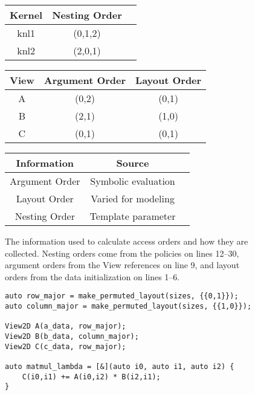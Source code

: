 \begin{figure*}

	\begin{subfigure}{0.9\textwidth}
		\begin{center}
			\begin{tabular} {|c|c|c|}
				\hline
				Kernel & Nesting Order \\ \hline
				knl1 & (0,1,2) \\
				knl2 & (2,0,1) \\
				\hline
			\end{tabular}
			\hspace{0.01\textwidth}
			\begin{tabular} {|c|c|c|}
				\hline 
				View & Argument Order & Layout Order \\  \hline 
				A & (0,2) & (0,1) \\ 
				B & (2,1) & (1,0) \\
				C & (0,1) & (0,1) \\
				\hline
			\end{tabular}
			\hspace{0.01\textwidth}
			\begin{tabular} {|c|c|c|}
				\hline
				Information & Source \\ \hline 
				Argument Order & Symbolic evaluation  \\
				Layout Order & Varied for modeling\\
				Nesting Order & Template parameter \\
				\hline
			\end{tabular}
		\end{center}
		\caption{The information used to calculate access orders and how they are collected. Nesting orders come from the policies on lines 12--30, argument orders from the View references on line 9, and layout orders from the data initialization on lines 1--6.}\label{accessOrder:orders}
	\end{subfigure}

	\vspace{10px}

	\begin{subfigure}[b]{0.40\textwidth}
		\begin{lstlisting}
auto row_major = make_permuted_layout(sizes, {{0,1}});
auto column_major = make_permuted_layout(sizes, {{1,0}});

View2D A(a_data, row_major); 
View2D B(b_data, column_major); 
View2D C(c_data, row_major);

auto matmul_lambda = [&](auto i0, auto i1, auto i2) {
	C(i0,i1) += A(i0,i2) * B(i2,i1);
}


\end{lstlisting}
\end{subfigure}
\end{figure*}
